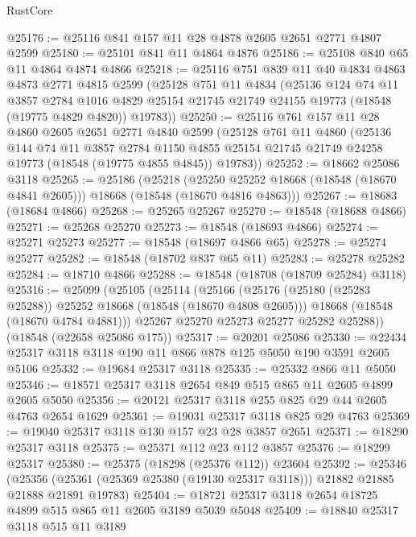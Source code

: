 \begin{lexlean}{RustCore}
\begin{coremodule}
@25176 := @25116 @841 @157 @11 @28 @4878 @2605 @2651 @2771 @4807 @2599
@25180 := @25101 @841 @11 @4864 @4876
@25186 := @25108 @840 @65 @11 @4864 @4874 @4866
@25218 := @25116
    @751
    @839
    @11
    @40
    @4834
    @4863
    @4873
    @2771
    @4815
    @2599
    (@25128
      @751
      @11
      @4834
      (@25136
        @124
        @74
        @11
        @3857
        @2784
        @1016
        @4829
        @25154
        @21745
        @21749
        @24155
        @19773
        (@18548 (@19775 @4829 @4820))
        @19783))
@25250 := @25116
    @761
    @157
    @11
    @28
    @4860
    @2605
    @2651
    @2771
    @4840
    @2599
    (@25128
      @761
      @11
      @4860
      (@25136
        @144
        @74
        @11
        @3857
        @2784
        @1150
        @4855
        @25154
        @21745
        @21749
        @24258
        @19773
        (@18548 (@19775 @4855 @4845))
        @19783))
@25252 := @18662 @25086 @3118
@25265 := @25186
    (@25218
      (@25250 @25252 @18668 (@18548 (@18670 @4841 @2605)))
      @18668
      (@18548 (@18670 @4816 @4863)))
@25267 := @18683 (@18684 @4866)
@25268 := @25265 @25267
@25270 := @18548 (@18688 @4866)
@25271 := @25268 @25270
@25273 := @18548 (@18693 @4866)
@25274 := @25271 @25273
@25277 := @18548 (@18697 @4866 @65)
@25278 := @25274 @25277
@25282 := @18548 (@18702 @837 @65 @11)
@25283 := @25278 @25282
@25284 := @18710 @4866
@25288 := @18548 (@18708 (@18709 @25284) @3118)
@25316 := @25099
    (@25105
      (@25114
        (@25166
          (@25176 (@25180 (@25283 @25288)) @25252 @18668 (@18548 (@18670 @4808 @2605)))
          @18668
          (@18548 (@18670 @4784 @4881)))
        @25267
        @25270
        @25273
        @25277
        @25282
        @25288))
    (@18548 (@22658 @25086 @175))
@25317 := @20201 @25086
@25330 := @22434 @25317 @3118 @3118 @190 @11 @866 @878 @125 @5050 @190 @3591 @2605 @5106
@25332 := @19684 @25317 @3118
@25335 := @25332 @866 @11 @5050
@25346 := @18571 @25317 @3118 @2654 @849 @515 @865 @11 @2605 @4899 @2605 @5050
@25356 := @20121 @25317 @3118 @255 @825 @29 @44 @2605 @4763 @2654 @1629
@25361 := @19031 @25317 @3118 @825 @29 @4763
@25369 := @19040 @25317 @3118 @130 @157 @23 @28 @3857 @2651
@25371 := @18290 @25317 @3118
@25375 := @25371 @112 @23 @112 @3857
@25376 := @18299 @25317
@25380 := @25375 (@18298 (@25376 @112)) @23604
@25392 := @25346
    (@25356 (@25361 (@25369 @25380 (@19130 @25317 @3118))) @21882 @21885 @21888 @21891 @19783)
@25404 := @18721 @25317 @3118 @2654 @18725 @4899 @515 @865 @11 @2605 @3189 @5039 @5048
@25409 := @18840 @25317 @3118 @515 @11 @3189

\end{coremodule}
\end{lexlean}
